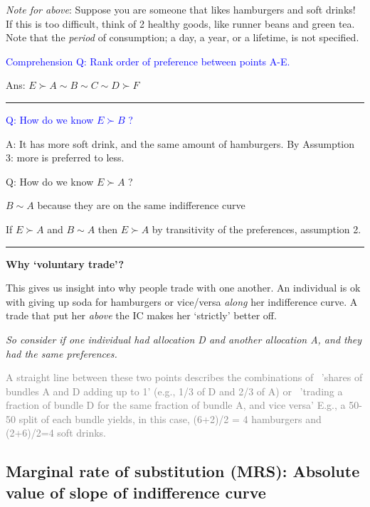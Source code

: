 \documentclass[]{article}
\begin{document}
\emph{Note for above}: Suppose you are someone that likes hamburgers and soft drinks! If this is too difficult, think of 2 healthy goods, like runner beans and green tea. Note that the \emph{period} of consumption; a day, a year, or a lifetime, is not specified.

\textcolor{blue}{Comprehension Q: Rank order of preference between points A-E.}

Ans: \(E \succ A \sim B \sim C \sim D \succ F\)

\begin{center}\rule{0.5\linewidth}{\linethickness}\end{center}

\textcolor{blue}{Q: How do we know $E \succ B$ ?}

A: It has more soft drink, and the same amount of hamburgers. By Assumption 3: more is preferred to less.\\

\bigskip

Q: How do we know \(E \succ A\) ?

\bigskip

\(B \sim A\) because they are on the same indifference curve

If \(E \succ A\) and \(B \sim A\) then \(E \succ A\) by transitivity of the preferences, assumption 2.

\begin{center}\rule{0.5\linewidth}{\linethickness}\end{center}

\textbf{Why `voluntary trade'?}

This gives us insight into why people trade with one another. An individual is ok with giving up soda for hamburgers or vice/versa \emph{along} her indifference curve. A trade that put her \emph{above} the IC makes her `strictly' better off.

\emph{So consider if one individual had allocation D and another allocation A, and they had the same preferences.}

\textcolor{gray}{A straight line between these two points describes the combinations of \
'shares of bundles A and D adding up to 1' (e.g., 1/3 of D and 2/3 of A)
or \
'trading a fraction of bundle D for the same fraction of bundle A, and vice versa'
E.g., a 50-50 split of each bundle yields, in this case, (6+2)/2 = 4 hamburgers and (2+6)/2=4 soft drinks.}

\hypertarget{marginal-rate-of-substitution-mrs-absolute-value-of-slope-of-indifference-curve}{%
\subsection{Marginal rate of substitution (MRS): Absolute value of slope of indifference curve}\label{marginal-rate-of-substitution-mrs-absolute-value-of-slope-of-indifference-curve}}
\end{document}
